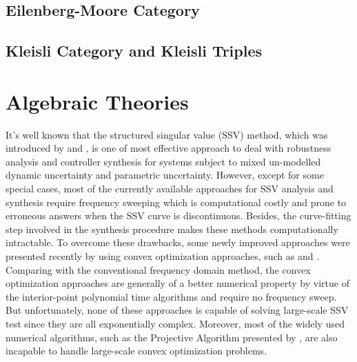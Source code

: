 \documentclass{article}
\begin{document}
\subsection{Eilenberg-Moore Category}

\subsection{Kleisli Category and Kleisli Triples}

\appendix
\section{Algebraic Theories}
It's well known that the structured singular value (SSV) method,
which was introduced by {\citet{PBC91}} and {\citet{AS10}},
is one of most effective approach to deal with robustness analysis and controller synthesis for systems
subject to mixed un-modelled dynamic uncertainty and parametric uncertainty.
However, except for some special cases, most of the currently available approaches for SSV analysis and synthesis require
frequency sweeping which is computational costly and prone to erroneous answers
when the SSV curve is discontinuous.
Besides, the curve-fitting step involved in the synthesis procedure makes these methods computationally intractable.
To overcome these drawbacks, some newly improved approaches were presented recently by using convex optimization approaches,
such as {\citep{BirddeMoor96:Algebra}} and {\citep{AV12}}.
Comparing with the conventional frequency domain method,
the convex optimization approaches are generally of a better numerical property
by virtue of the interior-point polynomial time algorithms{\citep{AM75}} and require no frequency sweep.
But unfortunately, none of these approaches is capable of solving large-scale SSV test
since they are all exponentially complex.
Moreover, most of the widely used numerical algorithms,
such as the Projective Algorithm presented by {\citet{MLS98}},
are also incapable to handle large-scale convex optimization problems.
\end{document}
